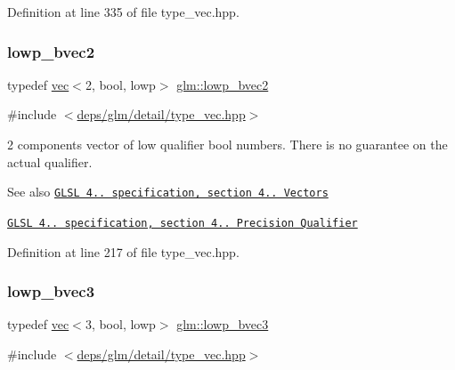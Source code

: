 Definition at line 335 of file type\+\_\+vec.\+hpp.

\mbox{\label{group__core__precision_ga5529a08a5bb9e851a582f7c4cfa74ba0}} 
\subsubsection{\texorpdfstring{lowp\+\_\+bvec2}{lowp\_bvec2}}
{\footnotesize\ttfamily typedef \hyperlink{structglm_1_1vec}{vec}$<$2, bool, lowp$>$ \hyperlink{group__core__precision_ga5529a08a5bb9e851a582f7c4cfa74ba0}{glm\+::lowp\+\_\+bvec2}}



{\ttfamily \#include $<$\hyperlink{type__vec_8hpp}{deps/glm/detail/type\+\_\+vec.\+hpp}$>$}

2 components vector of low qualifier bool numbers. There is no guarantee on the actual qualifier.

\begin{DoxySeeAlso}{See also}
\href{http://www.opengl.org/registry/doc/GLSLangSpec.4.20.8.pdf}{\tt G\+L\+SL 4.. specification, section 4.. Vectors} 

\href{http://www.opengl.org/registry/doc/GLSLangSpec.4.20.8.pdf}{\tt G\+L\+SL 4.. specification, section 4.. Precision Qualifier} 
\end{DoxySeeAlso}


Definition at line 217 of file type\+\_\+vec.\+hpp.

\mbox{\label{group__core__precision_gad68503417ddfd296669e9af59f3e0d1c}} 
\subsubsection{\texorpdfstring{lowp\+\_\+bvec3}{lowp\_bvec3}}
{\footnotesize\ttfamily typedef \hyperlink{structglm_1_1vec}{vec}$<$3, bool, lowp$>$ \hyperlink{group__core__precision_gad68503417ddfd296669e9af59f3e0d1c}{glm\+::lowp\+\_\+bvec3}}



{\ttfamily \#include $<$\hyperlink{type__vec_8hpp}{deps/glm/detail/type\+\_\+vec.\+hpp}$>$}

